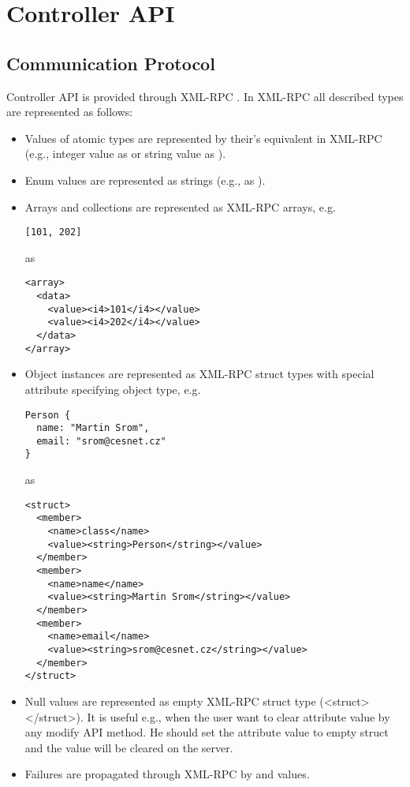 \chapter{Controller API}
\label{chapter:controller-api}



\section{Communication Protocol}
Controller API is provided through XML-RPC \cite{xml-rpc}.
In XML-RPC all described types are represented as follows:

\begin{itemize}

\item Values of atomic types are represented by their's equivalent in XML-RPC (e.g., integer value  as  or string value  as ).

\item Enum values are represented as strings (e.g.,  as ).

\item Arrays and collections are represented as XML-RPC arrays, e.g.
\begin{verbatim}
[101, 202]
\end{verbatim}
as
\begin{verbatim}
<array>
  <data>
    <value><i4>101</i4></value>
    <value><i4>202</i4></value>
  </data>
</array>
\end{verbatim}

\item Object instances are represented as XML-RPC struct types with special  attribute specifying object type, e.g.
\begin{verbatim}
Person {
  name: "Martin Srom",
  email: "srom@cesnet.cz"
}
\end{verbatim}
as
\begin{verbatim}
<struct>
  <member>
    <name>class</name>
    <value><string>Person</string></value>
  </member>
  <member>
    <name>name</name>
    <value><string>Martin Srom</string></value>
  </member>
  <member>
    <name>email</name>
    <value><string>srom@cesnet.cz</string></value>
  </member>
</struct>
\end{verbatim}

\item Null values are represented as empty XML-RPC struct type (<struct></struct>). It is useful e.g., when the user want to clear attribute value by any modify API method. He should set the attribute value to empty struct and the value will be cleared on the server.

\item Failures are propagated through XML-RPC by  and  values.

\end{itemize}


